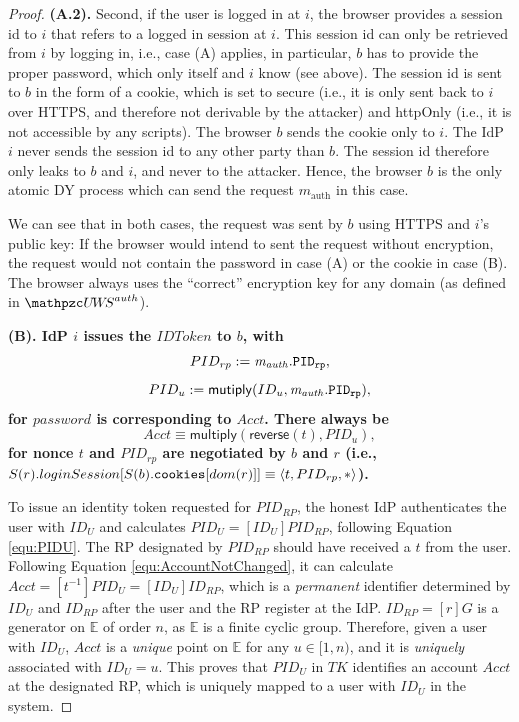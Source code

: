 \begin{proof}
    \textbf{(A.2).} Second, if the user is logged in at $i$, the 
    browser provides a session id to $i$ that refers to a 
    logged in session at $i$. This session id can only be 
    retrieved from $i$ by logging in, i.e., case (A) applies, 
    in particular, $b$ has to provide the proper password, 
    which only itself and $i$ know (see above). The session id 
    is sent to $b$ in the form of a cookie, which is set to 
    secure (i.e., it is only sent back to $i$ over HTTPS, and
    therefore not derivable by the attacker) and httpOnly 
    (i.e., it is not accessible by any scripts). The browser $b$ 
    sends the cookie only to $i$. The IdP $i$ never sends the 
    session id to any other party than $b$. The session id 
    therefore only leaks to $b$ and $i$, and never to the 
    attacker. Hence, the browser $b$ is the only atomic DY 
    process which can send the request $m_\text{auth}$ in this case.
  
    We can see that in both cases, the request was sent by $b$ 
    using HTTPS and $i$'s public key: If the browser would 
    intend to sent the request without encryption, the request 
    would not contain the password in case (A) or the cookie in 
    case (B). The browser always uses the ``correct'' encryption 
    key for any domain (as defined in $\uppressoauthwebsystem$).
  
	\textbf{(B). IdP $i$ issues the $IDToken$ to $b$, with
    $$ PID_{rp} := \mathit{m_{auth}.\mathtt{PID_{rp}}}, $$ 
    $$ PID_u := \mathsf{mutiply}(ID_u, \mathit{m_{auth}.\mathtt{PID_{rp}}}), $$ 
    for $password$ is corresponding to $Acct$. There always be
	$$ Acct \equiv \mathsf{multiply}(\mathsf{reverse}(t), PID_u),$$
	for nonce $t$ and $PID_{rp}$ are negotiated by $b$ and $r$ (i.e., $S(r).loginSession[S(b).\mathtt{cookies}[dom(r)]] \equiv \langle t, PID_{rp}, *\rangle$).    
    }
    
    To issue an identity token requested for $PID_{RP}$, the honest IdP authenticates the user with $ID_U$ and calculates $PID_U = [ID_U]PID_{RP}$, following Equation \ref{equ:PIDU}. The RP designated by $PID_{RP}$ should have received a $t$ from the user. Following Equation \ref{equ:AccountNotChanged}, it can calculate $Acct = [t^{-1}]PID_{U} = [ID_U]ID_{RP}$, which is a \emph{permanent} identifier determined by $ID_U$ and $ID_{RP}$ after the user and the RP register at the IdP. $ID_{RP} = [r]G$ is a generator on $\mathbb{E}$ of order $n$, as $\mathbb{E}$ is a finite cyclic group. Therefore, given a user with $ID_U$, $Acct$ is a \emph{unique} point on $\mathbb{E}$ for any $u \in [1, n)$, and it is \emph{uniquely} associated with $ID_U=u$. 
This proves that $PID_U$ in $TK$ identifies an account $Acct$ at the designated RP, which is uniquely mapped to a user with $ID_U$ in the system.


\end{proof}
